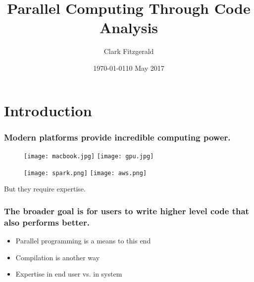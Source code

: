 \documentclass{beamer}
\begin{document}
\title{Parallel Computing Through Code Analysis}
\date{\today}
\date{10 May 2017}
\author{Clark Fitzgerald}

\frame{\titlepage}


\section{Introduction}
\begin{frame}

\frametitle{Modern platforms provide incredible computing power.}


\begin{figure}
            \texttt{[image: macbook.jpg]}
            \texttt{[image: gpu.jpg]}
\end{figure}
\begin{figure}
            \texttt{[image: spark.png]}
            \texttt{[image: aws.png]}
\end{figure}

\pause 

But they require expertise.

\end{frame}
\begin{frame}

    \frametitle{The broader goal is for users to write higher level code
    that also performs better.}



    \begin{itemize}
        \item Parallel programming is a means to this end
        \item Compilation is another way
        \item Expertise in end user vs. in system
    \end{itemize}

\end{frame}
\end{document}
